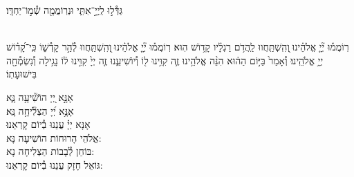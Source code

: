 \documentclass[twoside, openany, parskip=half, 11pt]{book}
\begin{document}
\shatz
גַּדְּ֯ל֣וּ לַֽיְיָ֣־אִתִּ֑י וּנְרֽוֹמֲמָ֖ה שְׁ֯מ֣וֹ־יַחְדָּֽו׃

\\
רֽוֹמֲמ֡וּ יְ֘יָ֤ אֱלֹהֵ֗ינוּ ֖וְהִֽשְׁתַּֽחֲווּ לַֽהֲדֹ֥ם רַגְלָ֗יו קָד֥וֹשׁ הֽוּא׃
רֽוֹמֲמ֡וּ יְ֘יָ֤ אֱלֹהֵ֗ינוּ ֖וְהִֽשְׁתַּֽחֲווּ לְ֯הַ֣ר קָדְ֯שׁ֑וֹ כִּֽי־קָ֝ד֗וֹשׁ יְיָ֥ אֱלֹהֵֽינוּ׃
וְ֯אָמַר֙ בַּיּ֣וֹם הַה֔וּא הִנֵּ֨ה אֱלֹהֵ֥ינוּ זֶ֛ה קִוִּ֥ינוּ ל֖וֹ וְ֯יוֹשִׁיעֵ֑נוּ זֶ֤ה יְיָ֙ קִוִּ֣ינוּ ל֔וֹ נָגִ֥ילָה וְ֯נִשְׂמְ֯חָ֖ה בִּישׁוּעָתֽוֹ׃



אָנָּ֣א יְ֭יָ הוֹשִׁ֘יעָ֥ה נָּ֑א\\
אָנָּ֥א יְ֝יָ הַצְלִ֘יחָ֥ה נָּֽא׃\\
אָנָּא יְיָ֗ עֲנֵנוּ בְ֯יוֹם קׇרְאֵנוּ׃\\

אֱלֹהֵי הָרוּחוֹת הוֹשִׁיעָה נָּא:\\ בּוֹחֵן לְ֯בָבוֹת הַצְלִיחָה נָא:\\ גּוֹאֵל חָזָק עֲנֵנוּ בְ֯יוֹם קׇרְאֵנוּ:


\end{document}
